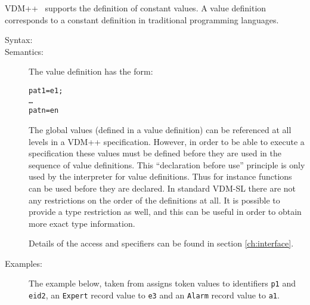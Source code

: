 \documentclass[\pformat,12pt]{article}
\newcommand{\vdmslpp}[2]{%
#2
}
\newcommand{\vdmsl}{VDM-SL}
\newcommand{\vdmpp}{VDM++}
\begin{document}
\vdmslpp{\vdmsl}{\vdmpp}\ supports the definition of constant
values. A value definition corresponds to a constant definition in
traditional programming languages.

\begin{description}
\item[Syntax:]




\item[Semantics:] The value definition has the form:
  \begin{alltt}
       pat1 = e1;
      \ldots
       patn = en
  \end{alltt}

  
  The global values (defined in a value definition) can be referenced
  at all levels in a \vdmslpp{\vdmsl}{\vdmpp} specification.  However,
  in order to be able to execute a specification these 
  values must be defined before they are used in the sequence of value
  definitions. This ``declaration before use'' principle is only used
  by the interpreter for value definitions.
  Thus for instance functions can be used before they are declared. In
  standard VDM-SL there are not any restrictions on the order of the
  definitions at all. It is possible to provide a type restriction as
  well, and this can be useful in order to obtain more exact type
  information.

Details of the access and  specifiers can be found in
section \ref{ch:interface}. 

\item[Examples:] The example below, taken from \cite{Fitzgerald&98}
  assigns token values to identifiers  
  \texttt{p1} and \texttt{eid2}, an \texttt{Expert} record value to 
  \texttt{e3} and an \texttt{Alarm} record value to \texttt{a1}.
\begin{alltt}


\end{alltt}
\end{description}
\end{document}
